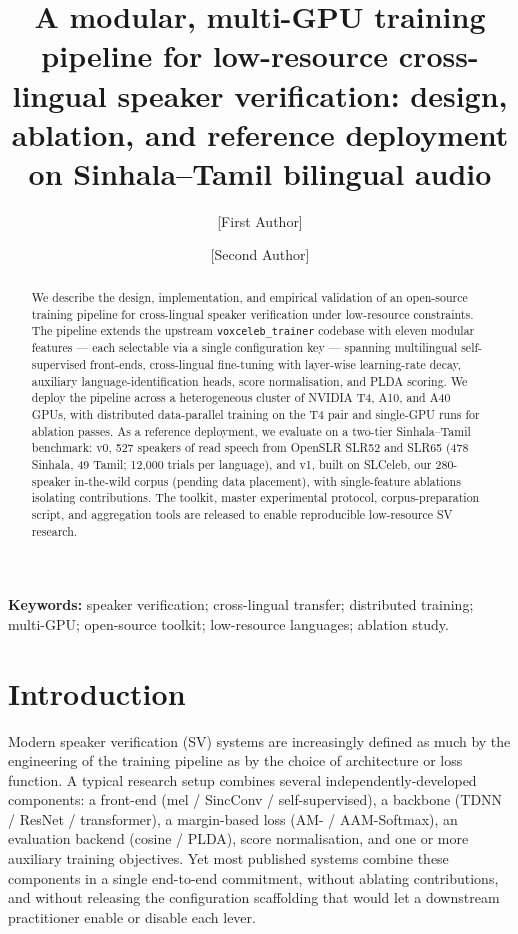 \documentclass[11pt,a4paper]{article}
\title{A modular, multi-GPU training pipeline for low-resource
cross-lingual speaker verification: design, ablation, and reference
deployment on Sinhala--Tamil bilingual audio}
\author[1]{[First Author]}
\author[1]{[Second Author]}
\affil[1]{[Department], [University], Sri Lanka. \\
\texttt{[email@institution]}}
\date{}
\begin{document}
\maketitle

\begin{abstract}
\noindent We describe the design, implementation, and empirical
validation of an open-source training pipeline for cross-lingual
speaker verification under low-resource constraints. The pipeline
extends the upstream \texttt{voxceleb\_trainer} codebase with eleven
modular features --- each selectable via a single configuration key
--- spanning multilingual self-supervised front-ends, cross-lingual
fine-tuning with layer-wise learning-rate decay, auxiliary
language-identification heads, score normalisation, and PLDA
scoring. We deploy the pipeline across a heterogeneous cluster of
NVIDIA T4, A10, and A40 GPUs, with distributed data-parallel training
on the T4 pair and single-GPU runs for ablation passes. As a
reference deployment, we evaluate on a two-tier Sinhala--Tamil
benchmark: v0, 527 speakers of read speech from OpenSLR SLR52 and
SLR65 (478 Sinhala, 49 Tamil; 12{,}000 trials per language), and v1,
built on SLCeleb, our 280-speaker in-the-wild corpus (pending data
placement), with single-feature ablations isolating contributions. The toolkit, master experimental protocol,
corpus-preparation script, and aggregation tools are released to
enable reproducible low-resource SV research.
\end{abstract}

\noindent \textbf{Keywords:} speaker verification; cross-lingual
transfer; distributed training; multi-GPU; open-source toolkit;
low-resource languages; ablation study.

\section{Introduction}
\label{sec:intro}

Modern speaker verification (SV) systems are increasingly defined as
much by the engineering of the training pipeline as by the choice of
architecture or loss function. A typical research setup combines
several independently-developed components: a front-end (mel /
SincConv / self-supervised), a backbone (TDNN / ResNet / transformer),
a margin-based loss (AM- / AAM-Softmax), an evaluation backend
(cosine / PLDA), score normalisation, and one or more auxiliary
training objectives. Yet most published systems combine these
components in a single end-to-end commitment, without ablating
contributions, and without releasing the configuration scaffolding
that would let a downstream practitioner enable or disable each lever.
\end{document}
